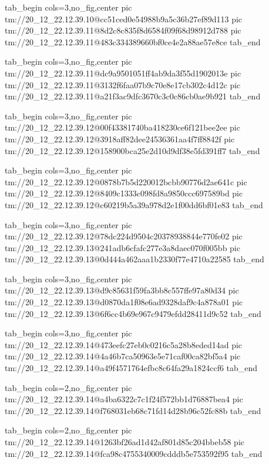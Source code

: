 \ifcmt
  tab_begin cols=3,no_fig,center
    pic tm://20_12_22.12.39.10@cc51ced0e54988b9a5c36b27ef89d113
    pic tm://20_12_22.12.39.11@8d2c8c835f8d6584f09f68d98912d788
    pic tm://20_12_22.12.39.11@483c334389660bf0ce4e2a88ae57e8ce
  tab_end
\fi


\ifcmt
  tab_begin cols=3,no_fig,center
    pic tm://20_12_22.12.39.11@dc9a9501051ff4ab9da3f55d1902013e
    pic tm://20_12_22.12.39.11@3132f6faa07b9c70e8e17cb302c4d12c
    pic tm://20_12_22.12.39.11@a21f3ac9dfc3670c3c0c86cb0ae9b921
  tab_end
\fi


\ifcmt
  tab_begin cols=3,no_fig,center
    pic tm://20_12_22.12.39.12@00f43381740ba418230ce6f121bee2ee
    pic tm://20_12_22.12.39.12@3918aff82dee24536361aa4f7ff8842f
    pic tm://20_12_22.12.39.12@158900bca25e2d10d9df38e5fd391ff7
  tab_end
\fi


\ifcmt
  tab_begin cols=3,no_fig,center
    pic tm://20_12_22.12.39.12@0878b7b5d220012bcbb90776d2ae641c
    pic tm://20_12_22.12.39.12@8409c1333c098fd8a9850ccc697589bd
    pic tm://20_12_22.12.39.12@c60219b5a39a978d2e1f00dd6bf01e83
  tab_end
\fi


\ifcmt
  tab_begin cols=3,no_fig,center
    pic tm://20_12_22.12.39.12@78dc224d9504c20378938844e770fe02
    pic tm://20_12_22.12.39.13@241adb6cfafc277e3a8daec070f005bb
    pic tm://20_12_22.12.39.13@0d444a462aaa1b2330f77e4710a22585
  tab_end
\fi


\ifcmt
  tab_begin cols=3,no_fig,center
    pic tm://20_12_22.12.39.13@d9c85631f59fa3bb8c557ffe97a80d34
    pic tm://20_12_22.12.39.13@d0870da1f08e6ad9328daf9c4a878a01
    pic tm://20_12_22.12.39.13@6f6cc4b69e967c9479efdd28411d9c52
  tab_end
\fi


\ifcmt
  tab_begin cols=3,no_fig,center
    pic tm://20_12_22.12.39.14@473eefc27eb0c0216c5a28b8eded14ad
    pic tm://20_12_22.12.39.14@4a46b7ca50963e5e71caf00ca82bf5a4
    pic tm://20_12_22.12.39.14@a49f4571764efbc8c64fa29a1824ccf6
  tab_end
\fi


\ifcmt
  tab_begin cols=2,no_fig,center
    pic tm://20_12_22.12.39.14@a4ba6322c7c1f24f572bb1d76887bea4
    pic tm://20_12_22.12.39.14@f768031eb68c71fd14d28b96c52fc88b
  tab_end
\fi


\ifcmt
  tab_begin cols=2,no_fig,center
    pic tm://20_12_22.12.39.14@1263bf26ad1d42af801d85c204bbeb58
    pic tm://20_12_22.12.39.14@fca98c4755340009cdddb5e753592f95
  tab_end
\fi

